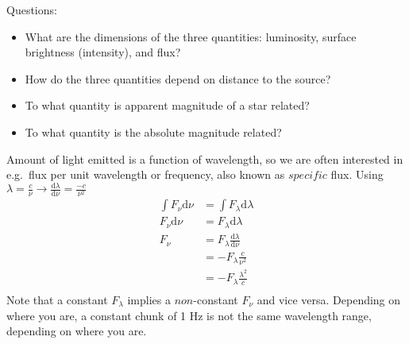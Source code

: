 \documentclass[12pt]{article}
\begin{document}
\noindent Questions:
\begin{itemize}
    \item What are the dimensions of the three quantities: luminosity,
        surface brightness (intensity), and flux?
    \item How do the three quantities depend on distance to the source?
    \item To what quantity is apparent magnitude of a star related?
    \item To what quantity is the absolute magnitude related?
\end{itemize}
Amount of light emitted is a function of wavelength, so we are often interested
in e.g.\ flux per unit wavelength or frequency, also known as $specific$
flux. Using $\lambda=\frac{c}{\nu} \rightarrow
\frac{\textrm{d}\lambda}{\textrm{d}\nu} = \frac{-c}{\nu^2}$
\begin{align*}
    \int F_{\nu} \textrm{d} \nu &= \int F_{\lambda} \textrm{d} \lambda\\
    F_{\nu} \textrm{d} \nu &= F_{\lambda} \textrm{d} \lambda\\
    F_{\nu} &= F_{\lambda} \frac{\textrm{d} \lambda}{\textrm{d}\nu}\\
    &= -F_{\lambda} \frac{c}{\nu^2}\\
    &= -F_{\lambda} \frac{\lambda^2}{c}\\
\end{align*}
Note that a constant $F_{\lambda}$ implies a $non$-constant $F_{\nu}$
and vice versa. Depending on where you are, a constant chunk of 1 Hz is
not the same wavelength range, depending on where you are.\\
\end{document}
